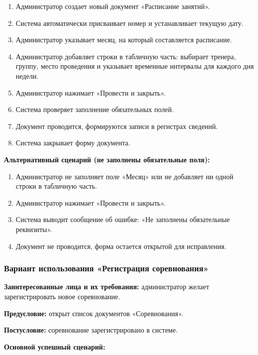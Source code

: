 \begin{enumerate}
	\item Администратор создает новый документ «Расписание занятий».
	\item Система автоматически присваивает номер и устанавливает текущую дату.
	\item Администратор указывает месяц, на который составляется расписание.
	\item Администратор добавляет строки в табличную часть: выбирает тренера, группу, место проведения и указывает временные интервалы для каждого дня недели.
	\item Администратор нажимает «Провести и закрыть».
	\item Система проверяет заполнение обязательных полей.
	\item Документ проводится, формируются записи в регистрах сведений.
	\item Система закрывает форму документа.
\end{enumerate}

\textbf{Альтернативный сценарий (не заполнены обязательные поля):}

\begin{enumerate}
	\item Администратор не заполняет поле «Месяц» или не добавляет ни одной строки в табличную часть.
	\item Администратор нажимает «Провести и закрыть».
	\item Система выводит сообщение об ошибке: «Не заполнены обязательные реквизиты».
	\item Документ не проводится, форма остается открытой для исправления.
\end{enumerate}

\subsubsection{Вариант использования «Регистрация соревнования»}

\textbf{Заинтересованные лица и их требования:} администратор желает зарегистрировать новое соревнование.

\textbf{Предусловие:} открыт список документов «Соревнования».

\textbf{Постусловие:} соревнование зарегистрировано в системе.

\textbf{Основной успешный сценарий:}

